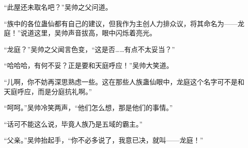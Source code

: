 \begin{this_body}
“此屋还未取名吧？”吴帅之父问道。

“族中的各位蛊仙都有自己的建议，但我作为主创人力排众议，将其命名为——龙庭！”说道这里，吴帅声音拔高，眼中闪烁着亮光。

“龙庭？”吴帅之父闻言色变，“这是否……有点不太妥当？”

“哈哈哈，有何不妥？正是要和天庭呼应！”吴帅大笑道。

“儿啊，你不妨再深思熟虑一些。这在那些人族蛊仙眼中，龙庭这个名字可不是和天庭呼应，而是分庭抗礼啊。”

“呵呵。”吴帅冷笑两声，“他们怎么想，那是他们的事情。”

“话可不能这么说，毕竟人族乃是五域的霸主。”

“父亲。”吴帅抬起手，“你不必多说了，我意已决，就叫——龙庭！”

\end{this_body}

